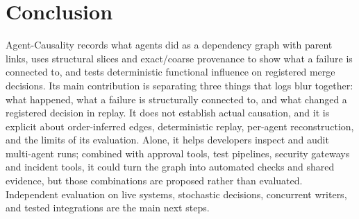 \documentclass[11pt]{article}
\begin{document}
\section{Conclusion}
Agent-Causality records what agents did as a dependency graph with parent links, uses structural slices and exact/coarse provenance to show what a failure is connected to, and tests deterministic functional influence on registered merge decisions. Its main contribution is separating three things that logs blur together: what happened, what a failure is structurally connected to, and what changed a registered decision in replay. It does not establish actual causation, and it is explicit about order-inferred edges, deterministic replay, per-agent reconstruction, and the limits of its evaluation. Alone, it helps developers inspect and audit multi-agent runs; combined with approval tools, test pipelines, security gateways and incident tools, it could turn the graph into automated checks and shared evidence, but those combinations are proposed rather than evaluated. Independent evaluation on live systems, stochastic decisions, concurrent writers, and tested integrations are the main next steps.
\end{document}
